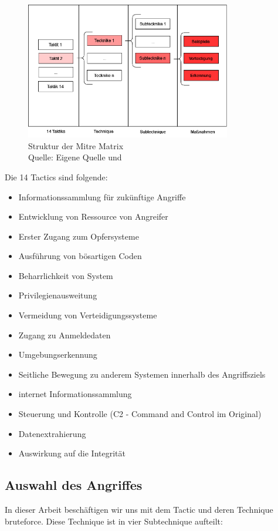 \begin{figure}[H]
   \centering
   \includegraphics[width=0.8\textwidth]{assets/Mitre_structure.drawio.png}
   \caption{Struktur der Mitre Matrix \\Quelle: Eigene Quelle und \citep{Mitre_Started}}
   \centering
\end{figure}

\newpage
Die 14 Tactics sind folgende:
\begin{itemize}[noitemsep]
   \item Informationssammlung für zukünftige Angriffe 
   \item	Entwicklung von Ressource von Angreifer
   \item Erster Zugang zum Opfersysteme 
   \item Ausführung von bösartigen Coden
   \item Beharrlichkeit von System
   \item	Privilegienausweitung
   \item Vermeidung von Verteidigungssysteme
   \item Zugang zu Anmeldedaten
   \item Umgebungserkennung
   \item Seitliche Bewegung zu anderem Systemen innerhalb des Angriffsziels
   \item internet Informationssammlung
   \item Steuerung und Kontrolle (C2 - Command and Control im Original)
   \item Datenextrahierung 
   \item	Auswirkung auf die Integrität
\end{itemize}


\subsection{Auswahl des Angriffes}
In dieser Arbeit beschäftigen wir uns mit dem Tactic  und deren Technique \gls{bruteforce}. Diese Technique ist in vier Subtechnique aufteilt:

